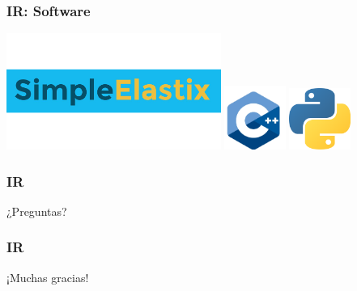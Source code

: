 \documentclass{beamer} %
\begin{document}
\begin{frame}
\frametitle{IR: Software}

\hfil\hfil\href{https://simpleelastix.github.io/}{\includegraphics[width=7cm]{images/logos/SimpleElastix.png}}\newline
  \null\hfil\hfil\makebox[5cm]{}\newline
  \pause
  \vfil
  \hfil\hfil\includegraphics[width=2cm]{images/logos/c.jpg}\hfil\hfil
    \includegraphics[width=2cm]{images/logos/python.png}\newline
  \null\hfil\hfil\makebox[5cm]{}
    \hfil\hfil\makebox[5cm]{}

\end{frame}

\begin{frame}
\frametitle{IR}

\begin{block}{}
\centering
\Huge ¿Preguntas?
\end{block}

\end{frame}

\begin{frame}
\frametitle{IR}

\begin{block}{}
\centering
\Huge ¡Muchas gracias!
\end{block}

\end{frame}
\end{document}
